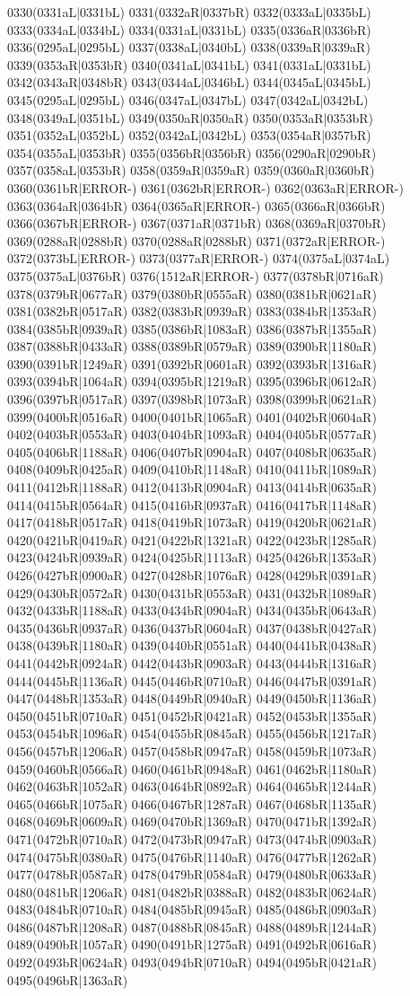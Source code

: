 0330(0331aL|0331bL) 0331(0332aR|0337bR) 0332(0333aL|0335bL) 0333(0334aL|0334bL) 0334(0331aL|0331bL) 0335(0336aR|0336bR) 0336(0295aL|0295bL) 0337(0338aL|0340bL) 0338(0339aR|0339aR) 0339(0353aR|0353bR) 0340(0341aL|0341bL) 0341(0331aL|0331bL) 0342(0343aR|0348bR) 0343(0344aL|0346bL) 0344(0345aL|0345bL) 0345(0295aL|0295bL) 0346(0347aL|0347bL) 0347(0342aL|0342bL) 0348(0349aL|0351bL) 0349(0350aR|0350aR) 0350(0353aR|0353bR) 0351(0352aL|0352bL) 0352(0342aL|0342bL) 0353(0354aR|0357bR) 0354(0355aL|0353bR) 0355(0356bR|0356bR) 0356(0290aR|0290bR) 0357(0358aL|0353bR) 0358(0359aR|0359aR) 0359(0360aR|0360bR) 0360(0361bR|ERROR-) 0361(0362bR|ERROR-) 0362(0363aR|ERROR-) 0363(0364aR|0364bR) 0364(0365aR|ERROR-) 0365(0366aR|0366bR) 0366(0367bR|ERROR-) 0367(0371aR|0371bR) 0368(0369aR|0370bR) 0369(0288aR|0288bR) 0370(0288aR|0288bR) 0371(0372aR|ERROR-) 0372(0373bL|ERROR-) 0373(0377aR|ERROR-) 0374(0375aL|0374aL) 0375(0375aL|0376bR) 0376(1512aR|ERROR-) 0377(0378bR|0716aR) 0378(0379bR|0677aR) 0379(0380bR|0555aR) 0380(0381bR|0621aR) 0381(0382bR|0517aR) 0382(0383bR|0939aR) 0383(0384bR|1353aR) 0384(0385bR|0939aR) 0385(0386bR|1083aR) 0386(0387bR|1355aR) 0387(0388bR|0433aR) 0388(0389bR|0579aR) 0389(0390bR|1180aR) 0390(0391bR|1249aR) 0391(0392bR|0601aR) 0392(0393bR|1316aR) 0393(0394bR|1064aR) 0394(0395bR|1219aR) 0395(0396bR|0612aR) 0396(0397bR|0517aR) 0397(0398bR|1073aR) 0398(0399bR|0621aR) 0399(0400bR|0516aR) 0400(0401bR|1065aR) 0401(0402bR|0604aR) 0402(0403bR|0553aR) 0403(0404bR|1093aR) 0404(0405bR|0577aR) 0405(0406bR|1188aR) 0406(0407bR|0904aR) 0407(0408bR|0635aR) 0408(0409bR|0425aR) 0409(0410bR|1148aR) 0410(0411bR|1089aR) 0411(0412bR|1188aR) 0412(0413bR|0904aR) 0413(0414bR|0635aR) 0414(0415bR|0564aR) 0415(0416bR|0937aR) 0416(0417bR|1148aR) 0417(0418bR|0517aR) 0418(0419bR|1073aR) 0419(0420bR|0621aR) 0420(0421bR|0419aR) 0421(0422bR|1321aR) 0422(0423bR|1285aR) 0423(0424bR|0939aR) 0424(0425bR|1113aR) 0425(0426bR|1353aR) 0426(0427bR|0900aR) 0427(0428bR|1076aR) 0428(0429bR|0391aR) 0429(0430bR|0572aR) 0430(0431bR|0553aR) 0431(0432bR|1089aR) 0432(0433bR|1188aR) 0433(0434bR|0904aR) 0434(0435bR|0643aR) 0435(0436bR|0937aR) 0436(0437bR|0604aR) 0437(0438bR|0427aR) 0438(0439bR|1180aR) 0439(0440bR|0551aR) 0440(0441bR|0438aR) 0441(0442bR|0924aR) 0442(0443bR|0903aR) 0443(0444bR|1316aR) 0444(0445bR|1136aR) 0445(0446bR|0710aR) 0446(0447bR|0391aR) 0447(0448bR|1353aR) 0448(0449bR|0940aR) 0449(0450bR|1136aR) 0450(0451bR|0710aR) 0451(0452bR|0421aR) 0452(0453bR|1355aR) 0453(0454bR|1096aR) 0454(0455bR|0845aR) 0455(0456bR|1217aR) 0456(0457bR|1206aR) 0457(0458bR|0947aR) 0458(0459bR|1073aR) 0459(0460bR|0566aR) 0460(0461bR|0948aR) 0461(0462bR|1180aR) 0462(0463bR|1052aR) 0463(0464bR|0892aR) 0464(0465bR|1244aR) 0465(0466bR|1075aR) 0466(0467bR|1287aR) 0467(0468bR|1135aR) 0468(0469bR|0609aR) 0469(0470bR|1369aR) 0470(0471bR|1392aR) 0471(0472bR|0710aR) 0472(0473bR|0947aR) 0473(0474bR|0903aR) 0474(0475bR|0380aR) 0475(0476bR|1140aR) 0476(0477bR|1262aR) 0477(0478bR|0587aR) 0478(0479bR|0584aR) 0479(0480bR|0633aR) 0480(0481bR|1206aR) 0481(0482bR|0388aR) 0482(0483bR|0624aR) 0483(0484bR|0710aR) 0484(0485bR|0945aR) 0485(0486bR|0903aR) 0486(0487bR|1208aR) 0487(0488bR|0845aR) 0488(0489bR|1244aR) 0489(0490bR|1057aR) 0490(0491bR|1275aR) 0491(0492bR|0616aR) 0492(0493bR|0624aR) 0493(0494bR|0710aR) 0494(0495bR|0421aR) 0495(0496bR|1363aR) 